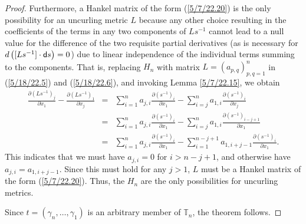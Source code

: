 \documentclass{amsart}
\numberwithin{equation}{section}
\theoremstyle{definition}
\numberwithin{theorem}{section}
\begin{document}
\begin{proof}
Furthermore, a Hankel matrix of the form (\ref{5/7/22.20}) is the only possibility for an uncurling metric $L$ because any other choice resulting in the coefficients of the terms in any two components of $Ls^{-1}$ cannot lead to a null value for the difference of the two requisite partial derivatives (as is necessary for $d\left([L s^{-1}]\cdot {\sf d}s\right) = 0$) due to linear independence of the individual terms summing to the components. That is, replacing  $H_n$ with matrix \enlargethispage{1cm}$L=(a_{p,q})_{p,q=1}^n$ in (\ref{5/18/22.5}) 
and (\ref{5/18/22.6}), and invoking Lemma \ref{5/7/22.15}, we obtain
\begin{eqnarray}\nonumber \frac{\partial \left(L s^{-1}\right)_j}{\partial x_1}  -  \frac{\partial \left(L s^{-1}\right)_1}{\partial x_j} &=&  \sum_{i=1}^n a_{j,i}\frac{\partial \left(s^{-1}\right)_i}{\partial x_1} - \sum_{i=j}^n a_{1,i}\frac{\partial \left(s^{-1}\right)_i}{\partial x_j} \\  &=& \sum_{i=1}^n a_{j,i}\frac{\partial \left(s^{-1}\right)_i}{\partial x_1} - \sum_{i=j}^n a_{1,i}\frac{\partial \left(s^{-1}\right)_{i-j+1}}{\partial x_1} \nonumber \\
&=& \sum_{i=1}^n a_{j,i}\frac{\partial \left(s^{-1}\right)_i}{\partial x_1} - \sum_{i=1}^{n-j+1} a_{1,i+j-1}\frac{\partial \left(s^{-1}\right)_i}{\partial x_1}.
\label{5/9/22.10}
\end{eqnarray}
This indicates that we must have $a_{j,i}=0$ for $i>n-j+1$, and otherwise have $a_{j,i} = a_{1,i+j-1}$.  Since this must hold for any $j>1$, $L$ must be a Hankel matrix of the form (\ref{5/7/22.20}).  Thus, the $H_n$ are the only possibilities for uncurling metrics. 

Since $t=(\gamma_n,\dots,\gamma_1)$ is an arbitrary member of $\mathbb{T}_n$, the theorem follows.
\end{proof}
\end{document}
